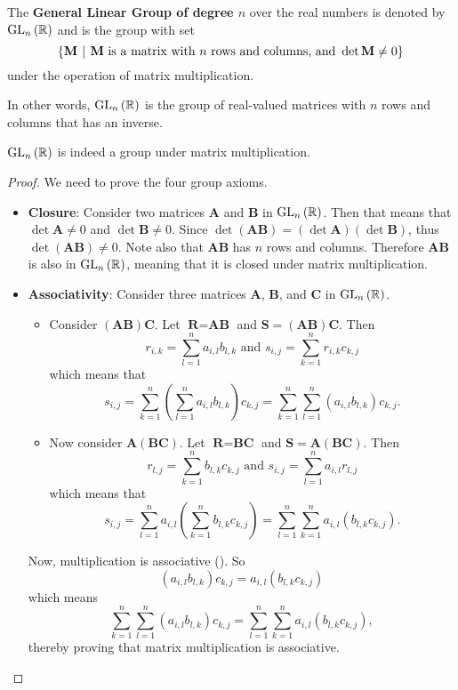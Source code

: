 \begin{definition}
    The \textbf{General Linear Group of degree $n$} over the real numbers is denoted by $\mathrm{GL}_{n}\left(\mathbb{R}\right)$ and is the group with set
    \[
        \left\{\textbf{M} \vert \text{\textbf{M} is a matrix with } n \text{ rows and columns, and } \det \textbf{M} \neq 0\right\}
    \]
    under the operation of matrix multiplication.
\end{definition}
In other words, $\mathrm{GL}_{n}\left(\mathbb{R}\right)$ is the group of real-valued matrices with $n$ rows and columns that has an inverse.

\begin{proposition}
    $\mathrm{GL}_{n}\left(\mathbb{R}\right)$ is indeed a group under matrix multiplication.
\end{proposition}
\begin{proof}
    We need to prove the four group axioms.
    \begin{itemize}
        \item \textbf{Closure}: Consider two matrices \textbf{A} and \textbf{B} in $\mathrm{GL}_{n}\left(\mathbb{R}\right)$. Then that means that $\det \textbf{A} \neq 0$ and $\det \textbf{B} \neq 0$. Since $\det(\textbf{AB}) = (\det \textbf{A})(\det \textbf{B})$, thus $\det(\textbf{AB}) \neq 0$. Note also that $\textbf{AB}$ has $n$ rows and columns. Therefore $\textbf{AB}$ is also in $\mathrm{GL}_{n}\left(\mathbb{R}\right)$, meaning that it is closed under matrix multiplication.

        \item \textbf{Associativity}: Consider three matrices \textbf{A}, \textbf{B}, and \textbf{C} in $\mathrm{GL}_{n}\left(\mathbb{R}\right)$.
        \begin{itemize}
            \item Consider $(\textbf{AB})\textbf{C}$. Let $\textbf{R} = \textbf{AB}$ and $\textbf{S} = (\textbf{AB})\textbf{C}$. Then
            \[
                r_{i,k} = \sum_{l=1}^n a_{i,l}b_{l,k} \text{ and } s_{i,j} = \sum_{k=1}^n r_{i,k}c_{k,j}
            \]
            which means that
            \[
                s_{i,j} = \sum_{k=1}^n \left(\sum_{l=1}^n a_{i,l}b_{l,k}\right)c_{k,j} = \sum_{k=1}^n \sum_{l=1}^n (a_{i,l}b_{l,k})c_{k,j}.
            \]
            \item Now consider $\textbf{A}(\textbf{BC})$. Let $\textbf{R} = \textbf{BC}$ and $\textbf{S} = \textbf{A}(\textbf{BC})$. Then
            \[
                r_{l,j} = \sum_{k=1}^nb_{l,k}c_{k,j} \text{ and } s_{i,j} = \sum_{l=1}^n a_{i,l}r_{l,j}
            \]
            which means that
            \[
                s_{i,j} = \sum_{l=1}^n a_{i,l}\left(\sum_{k=1}^nb_{l,k}c_{k,j}\right) = \sum_{l=1}^n\sum_{k=1}^n a_{i,l}(b_{l,k}c_{k,j}).
            \]
        \end{itemize}
        Now, multiplication is associative (). So
        \[
                (a_{i,l}b_{l,k})c_{k,j} = a_{i,l}(b_{l,k}c_{k,j})
        \]
        which means
        \[
            \sum_{k=1}^n \sum_{l=1}^n (a_{i,l}b_{l,k})c_{k,j} = \sum_{l=1}^n\sum_{k=1}^n a_{i,l}(b_{l,k}c_{k,j}),
        \]
        thereby proving that matrix multiplication is associative.


\end{itemize}
\end{proof}
